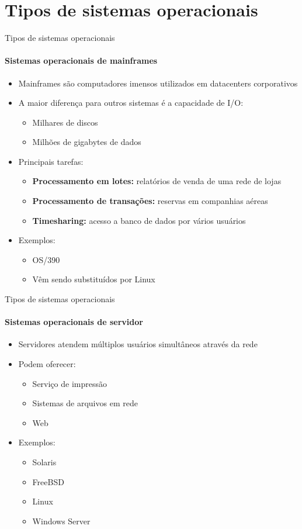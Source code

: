 \documentclass{beamer}
\begin{document}
\section{Tipos de sistemas operacionais}
\begin{frame}{Tipos de sistemas operacionais}
	\framesubtitle{Sistemas operacionais de mainframes}
	\begin{itemize}
		\item Mainframes são computadores imensos utilizados em datacenters corporativos
		\item A maior diferença para outros sistemas é a capacidade de I/O:
		\begin{itemize}
			\item Milhares de discos
			\item Milhões de gigabytes de dados
		\end{itemize}
		\item Principais tarefas:
		\begin{itemize}
			\item \textbf{Processamento em lotes:} relatórios de venda de uma rede de lojas
			\item \textbf{Processamento de transações:} reservas em companhias aéreas
			\item \textbf{Timesharing:} acesso a banco de dados por vários usuários
		\end{itemize}
		\item Exemplos:
		\begin{itemize}
			\item OS/390
			\item Vêm sendo substituídos por Linux
		\end{itemize}
	\end{itemize}
\end{frame}
\begin{frame}{Tipos de sistemas operacionais}
	\framesubtitle{Sistemas operacionais de servidor}
	\begin{itemize}
		\item Servidores atendem múltiplos usuários simultâneos através da rede
		\item Podem oferecer:
		\begin{itemize}
			\item Serviço de impressão
			\item Sistemas de arquivos em rede
			\item Web
		\end{itemize}
		\item Exemplos:
		\begin{itemize}
			\item Solaris
			\item FreeBSD
			\item Linux
			\item Windows Server
		\end{itemize}
	\end{itemize}
\end{frame}
\end{document}
